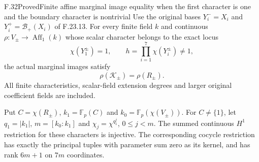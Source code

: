 \begin{claim}{F.32}{Proved}{Finite affine marginal image equality when the first character is one and the boundary character is nontrivial}
Use the original bases $Y_i^-=X_i$ and
$Y_i^+=\mathcal B_+(X_i)$ of F.23.13.
For every finite field $k$ and continuous
$\rho:V_\pm\to\operatorname{Aff}_1(k)$ whose
scalar character belongs to the exact locus
\[
 \chi(Y_1^\pm)=1,\qquad
                 h=\prod_{i=1}^7\chi(Y_i^\pm)\ne1,
                                                               \tag{F.32.1}
\]
the actual marginal images satisfy
\[
                         \rho(\mathcal K_\pm)=\rho(R_\pm).
                                                               \tag{F.32.2}
\]
All finite characteristics, scalar-field
extension degrees and larger original
coefficient fields are included.

Put $C=\chi(R_\pm)$,
$k_1=\mathbb F_p(C)$ and
$k_0=\mathbb F_p(\chi(V_\pm))$.
For $C\ne\{1\}$, let $q_1=|k_1|$,
$m=[k_0:k_1]$ and
$\chi_j=\chi^{q_1^j}$, $0\leq j<m$.
The summed continuous $H^1$ restriction
for these characters is injective.
The corresponding cocycle restriction
has exactly the principal tuples with
parameter sum zero as its kernel,
and has rank $6m+1$ on $7m$ coordinates.
\end{claim}

